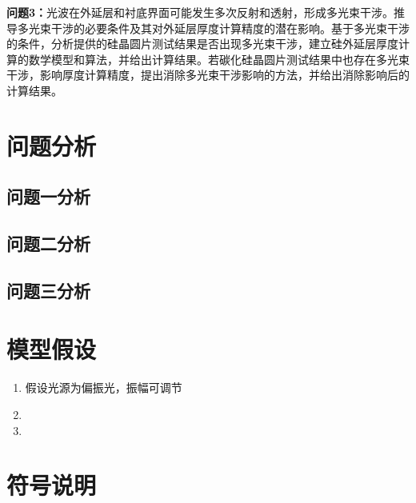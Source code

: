 \documentclass[withoutpreface,bwprint]{cumcmthesis} %
\begin{document}
\textbf{问题3：}光波在外延层和衬底界面可能发生多次反射和透射，形成多光束干涉。推导多光束干涉的必要条件及其对外延层厚度计算精度的潜在影响。基于多光束干涉的条件，分析提供的硅晶圆片测试结果是否出现多光束干涉，建立硅外延层厚度计算的数学模型和算法，并给出计算结果。若碳化硅晶圆片测试结果中也存在多光束干涉，影响厚度计算精度，提出消除多光束干涉影响的方法，并给出消除影响后的计算结果。


\section{问题分析}

\subsection{问题一分析}

\subsection{问题二分析}

\subsection{问题三分析}

\section{模型假设}

\begin{enumerate}
    \item 假设光源为偏振光，振幅可调节
    \item 
    \item 
\end{enumerate}

\section{符号说明}
\end{document}
